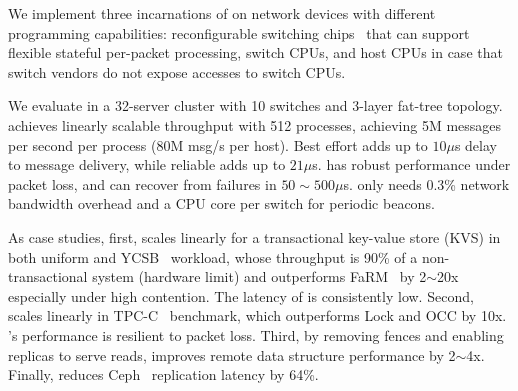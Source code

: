 We implement three incarnations of \sys on network devices with different programming capabilities: reconfigurable switching chips~\cite{tofino,cavium} that can support flexible stateful per-packet processing, switch CPUs, and host CPUs in case that switch vendors do not expose accesses to switch CPUs.



We evaluate \sys in a 32-server cluster with 10 switches and 3-layer fat-tree topology.
\sys{} achieves linearly scalable throughput with 512 processes, achieving 5M messages per second per process (80M msg/s per host).
Best effort \sys{} adds up to $10 \mu$s delay to message delivery, while reliable \sys{} adds up to $21 \mu$s.
\sys{} has robust performance under packet loss, and can recover from failures in $50 \sim 500 \mu$s.
\sys{} only needs 0.3\% network bandwidth overhead and a CPU core per switch for periodic beacons.

As case studies, first, \sys{} scales linearly for a transactional key-value store (KVS) in both uniform and YCSB~\cite{cooper2010benchmarking} workload, whose throughput is 90\% of a non-transactional system (hardware limit) and outperforms FaRM~\cite{dragojevic2014farm} by 2$\sim$20x especially under high contention.
The latency of \sys{} is consistently low.
Second, \sys{} scales linearly in TPC-C~\cite{tpcc} benchmark, which outperforms Lock and OCC by 10x. \sys{}'s performance is resilient to packet loss.
Third, by removing fences and enabling replicas to serve reads, \sys{} improves remote data structure performance by 2$\sim$4x.
Finally, \sys{} reduces Ceph~\cite{weil2006ceph} replication latency by 64\%.

